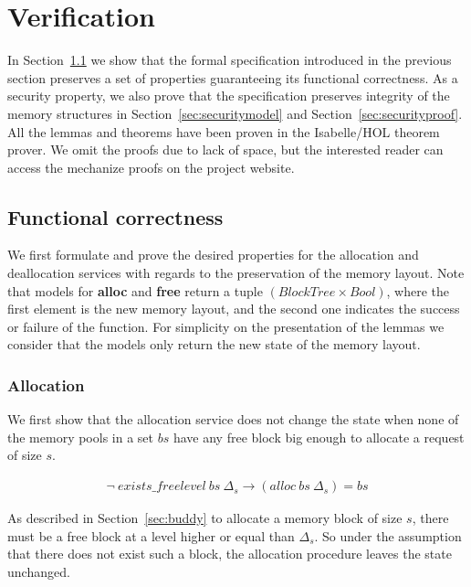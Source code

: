 \section{Verification}
In Section~\ref{sec:functional} we show that the formal specification introduced in the previous section preserves a set of properties guaranteeing its functional correctness. As a security property, we also prove that the specification preserves integrity of the memory structures in Section~\ref{sec:securitymodel} and Section~\ref{sec:securityproof}. All the lemmas and theorems have been proven in the Isabelle/HOL theorem prover. We omit the proofs due to lack of space, but the interested reader can access the mechanize proofs on the project website.

\subsection{Functional correctness}\label{sec:functional}
We first formulate and prove the desired properties for the allocation and deallocation services with regards to the preservation of the memory layout. Note that models for \textbf{alloc} and \textbf{free} return a tuple $(BlockTree \times Bool)$, where the first element is the new memory layout, and the second one indicates the success or failure of the function. For simplicity on the presentation of the lemmas we consider that the models only return the new state of the memory layout.

\subsubsection{Allocation}\label{sec:functionalalloc}
We first show that the allocation service does not change the state when none of the memory pools in a set $bs$ have any free block big enough to allocate a request of size $s$. 

\begin{lemma} 
\label{lemma:no_free_space}
\begin{align*}
\neg\ exists\_freelevel\ bs\ \Delta_s \longrightarrow (alloc\ bs\ \Delta_s) = bs
\end{align*}
\end{lemma}

As described in Section~\ref{sec:buddy} to allocate a memory block of size $s$, there must be a free block at a level higher or equal than $\Delta_s$. So under the assumption that there does not exist such a block, the allocation procedure leaves the state unchanged.

